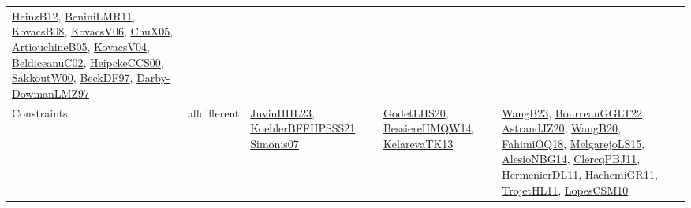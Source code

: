 {\begin{longtable}{lp{3cm}>{\raggedright}p{6cm}>{\raggedright}p{6cm}p{8cm}}
\href{papers/HeinzB12.pdf}{HeinzB12}\cite{HeinzB12}, \href{articles/BeniniLMR11.pdf}{BeniniLMR11}\cite{BeniniLMR11}, \href{articles/KovacsB08.pdf}{KovacsB08}\cite{KovacsB08}, \href{papers/KovacsV06.pdf}{KovacsV06}\cite{KovacsV06}, \href{papers/ChuX05.pdf}{ChuX05}\cite{ChuX05}, \href{papers/ArtiouchineB05.pdf}{ArtiouchineB05}\cite{ArtiouchineB05}, \href{papers/KovacsV04.pdf}{KovacsV04}\cite{KovacsV04}, \href{papers/BeldiceanuC02.pdf}{BeldiceanuC02}\cite{BeldiceanuC02}, \href{articles/HeipckeCCS00.pdf}{HeipckeCCS00}\cite{HeipckeCCS00}, \href{articles/SakkoutW00.pdf}{SakkoutW00}\cite{SakkoutW00}, \href{papers/BeckDF97.pdf}{BeckDF97}\cite{BeckDF97}, \href{articles/Darby-DowmanLMZ97.pdf}{Darby-DowmanLMZ97}\cite{Darby-DowmanLMZ97}\\
Constraints & alldifferent & \href{papers/JuvinHHL23.pdf}{JuvinHHL23}\cite{JuvinHHL23}, \href{articles/KoehlerBFFHPSSS21.pdf}{KoehlerBFFHPSSS21}\cite{KoehlerBFFHPSSS21}, \href{articles/Simonis07.pdf}{Simonis07}\cite{Simonis07} & \href{papers/GodetLHS20.pdf}{GodetLHS20}\cite{GodetLHS20}, \href{papers/BessiereHMQW14.pdf}{BessiereHMQW14}\cite{BessiereHMQW14}, \href{papers/KelarevaTK13.pdf}{KelarevaTK13}\cite{KelarevaTK13} & \href{papers/WangB23.pdf}{WangB23}\cite{WangB23}, \href{articles/BourreauGGLT22.pdf}{BourreauGGLT22}\cite{BourreauGGLT22}, \href{articles/AstrandJZ20.pdf}{AstrandJZ20}\cite{AstrandJZ20}, \href{papers/WangB20.pdf}{WangB20}\cite{WangB20}, \href{articles/FahimiOQ18.pdf}{FahimiOQ18}\cite{FahimiOQ18}, \href{papers/MelgarejoLS15.pdf}{MelgarejoLS15}\cite{MelgarejoLS15}, \href{papers/AlesioNBG14.pdf}{AlesioNBG14}\cite{AlesioNBG14}, \href{papers/ClercqPBJ11.pdf}{ClercqPBJ11}\cite{ClercqPBJ11}, \href{papers/HermenierDL11.pdf}{HermenierDL11}\cite{HermenierDL11}, \href{articles/HachemiGR11.pdf}{HachemiGR11}\cite{HachemiGR11}, \href{articles/TrojetHL11.pdf}{TrojetHL11}\cite{TrojetHL11}, \href{articles/LopesCSM10.pdf}{LopesCSM10}\cite{LopesCSM10}\\

\end{longtable}}
